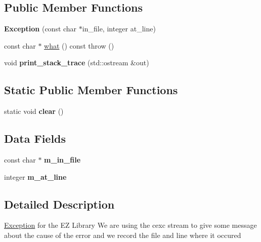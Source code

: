 \subsection*{Public Member Functions}
\begin{DoxyCompactItemize}
\item 
\mbox{\label{classez_1_1essential_1_1Exception_a0fd6d33274aa5d386399a1d35c65a640}} 
{\bfseries Exception} (const char $\ast$in\+\_\+file, integer at\+\_\+line)
\item 
const char $\ast$ \hyperlink{classez_1_1essential_1_1Exception_aa330aa854000f17a93919417d977bcac}{what} () const  throw ()
\item 
\mbox{\label{classez_1_1essential_1_1Exception_a8352ffc60d214a4b9a5739fee37bc829}} 
void {\bfseries print\+\_\+stack\+\_\+trace} (std\+::ostream \&out)
\end{DoxyCompactItemize}
\subsection*{Static Public Member Functions}
\begin{DoxyCompactItemize}
\item 
\mbox{\label{classez_1_1essential_1_1Exception_aedbe86bdf9456a597c6b9f11cde481fd}} 
static void {\bfseries clear} ()
\end{DoxyCompactItemize}
\subsection*{Data Fields}
\begin{DoxyCompactItemize}
\item 
\mbox{\label{classez_1_1essential_1_1Exception_aea83319eb701ca107bbfd3e5e3900840}} 
const char $\ast$ {\bfseries m\+\_\+in\+\_\+file}
\item 
\mbox{\label{classez_1_1essential_1_1Exception_a0d9fb7703923a5e5780429c9dd088592}} 
integer {\bfseries m\+\_\+at\+\_\+line}
\end{DoxyCompactItemize}


\subsection{Detailed Description}
\hyperlink{classez_1_1essential_1_1Exception}{Exception} for the EZ Library We are using the cexc stream to give some message about the cause of the error and we record the file and line where it occured 

